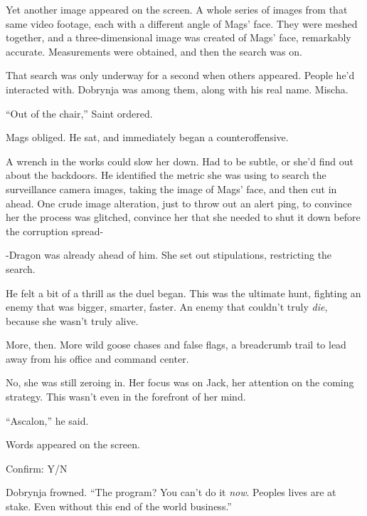 Yet another image appeared\emph{ }on the screen.  A whole series of images from that same video footage, each with a different angle of Mags' face.  They were meshed together, and a three-dimensional image was created of Mags' face, remarkably accurate.  Measurements were obtained, and then the search was on.



That search was only underway for a second when others appeared.  People he'd interacted with.  Dobrynja was among them, along with his real name.  Mischa.



``Out of the chair,'' Saint ordered.



Mags obliged.  He sat, and immediately began a counteroffensive.



A wrench in the works could slow her down.  Had to be subtle, or she'd find out about the backdoors.  He identified the metric she was using to search the surveillance camera images, taking the image of Mags' face, and then cut in ahead.  One crude image alteration, just to throw out an alert ping, to convince her the process was glitched, convince her that she needed to shut it down before the corruption spread-



-Dragon was already ahead of him.  She set out stipulations, restricting the search.



He felt a bit of a thrill as the duel began.  This was the ultimate hunt, fighting an enemy that was bigger, smarter, faster.  An enemy that couldn't truly \emph{die}, because she wasn't truly alive.



More, then.  More wild goose chases and false flags, a breadcrumb trail to lead away from his office and command center.



No, she was still zeroing in.  Her focus was on Jack, her attention on the coming strategy.  This wasn't even in the forefront of her mind.



``Ascalon,'' he said.



Words appeared on the screen.



Confirm: Y/N



Dobrynja frowned.  ``The program?  You can't do it \emph{now}.  Peoples lives are at stake.  Even without this end of the world business.''



